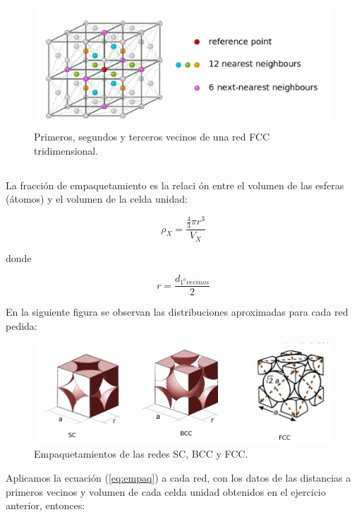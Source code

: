 \documentclass[a4paper]{article}
\begin{document}
\begin{figure}[H]
  \centering
  \includegraphics[width=0.7\linewidth,height=0.3\linewidth]{red3d_fcc.png}
  \caption{Primeros, segundos y terceros vecinos de una red FCC tridimensional.}
  \label{fig:red3d_fcc}
\end{figure}

\subsection{}

La fracci\'on de empaquetamiento es la relaci \'on entre el volumen de las esferas (\'atomos) y el volumen de la celda unidad:

\begin{equation}
\label{eq:empaq}
\rho_{X} = \frac{\frac{4}{3}\pi r^{3}}{V_{X}}
\end{equation}

donde

$$r = \frac{d_{1^{o} vecinos}}{2}$$

En la siguiente figura se observan las distribuciones aproximadas para cada red pedida:

\begin{figure}[H]
  \centering
  \includegraphics[width=0.9\linewidth,height=0.5\linewidth]{empaq.png}
  \caption{Empaquetamientos de las redes SC, BCC y FCC.}
  \label{fig:empaq}
\end{figure}

Aplicamos la ecuaci\'on (\ref{eq:empaq}) a cada red, con los datos de las distancias a primeros vecinos y volumen de cada celda unidad obtenidos en el ejercicio anterior, entonces:
\end{document}

